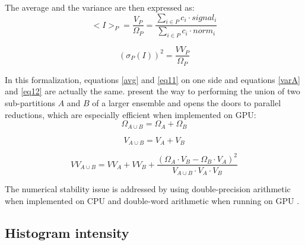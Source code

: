 \documentclass[preprint]{iucr}              %
\begin{document}
The average and the variance are then expressed as:
\begin{equation}
\label{eq11}
<I>_P = \frac{V_{P}}{\Omega_{P}} =  \frac{\sum\limits_{i \in P} c_i \cdot signal_i}
                        {\sum\limits_{i \in P} c_i \cdot norm_i} 
\end{equation}

\begin{equation}
\label{eq12}
(\sigma_P(I))^2 = \frac{VV_{P}}{\Omega_{P}}
\end{equation}

In this formalization, equations \ref{avg} and \ref{eq11} on one side and equations \ref{varA} and \ref{eq12} are actually the same.
 present the way to performing the union of two sub-partitions $A$ and $B$ of a larger ensemble and opens the doors to parallel reductions, which are especially efficient when implemented on GPU:
\begin{equation}
\Omega_{A \cup B} =  \Omega_{A} + \Omega_{B} 
\end{equation}

\begin{equation}
V_{A \cup B} =  V_{A} + V_{B} 
\end{equation}
  
\begin{equation}
VV_{A \cup B} =  VV_{A} + VV_{B} +  \frac{(\Omega_{A} \cdot V_{B} - \Omega_{B}\cdot V_{A})^2}{V_{A \cup B} \cdot  V_{A} \cdot V_{B}}
\end{equation}
  
The numerical stability issue is addressed by using double-precision arithmetic when implemented on CPU and double-word arithmetic when running on GPU \cite{double_word}.

\subsection{Histogram intensity }
\end{document}

